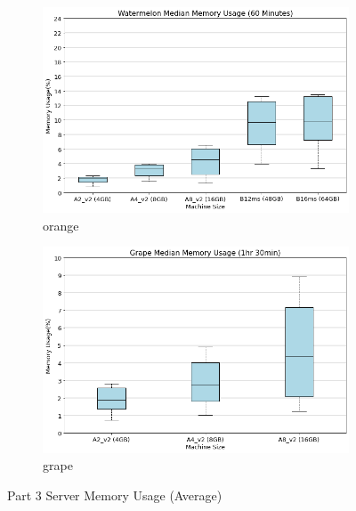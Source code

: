 \begin{figure}[H]
     \centering
     \begin{subfigure}[b]{0.49\textwidth}
         \centering
         \includegraphics[width=\textwidth]{images/watermelon_mem.png}
         \caption{orange}
         \label{fig:watermelon_mem}
     \end{subfigure}
     \hfill
     \begin{subfigure}[b]{0.49\textwidth}
         \centering
         \includegraphics[width=\textwidth]{images/grape_mem.png}
         \caption{grape}
         \label{fig:grape_mem}
     \end{subfigure}
    
        \caption{Part 3 Server Memory Usage (Average)}
        \label{fig:part_3_mem}
\end{figure}
